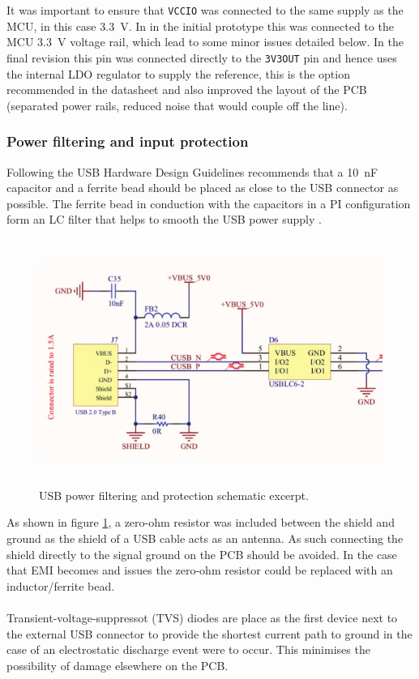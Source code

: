 It was important to ensure that \texttt{VCCIO} was connected to the same supply as the MCU, in this case \SI{3.3}{V}. In in the initial prototype this was connected to the MCU \SI{3.3}{V} voltage rail, which lead to some minor issues detailed below. In the final revision this pin was connected directly to the \texttt{3V3OUT} pin and hence uses the internal LDO regulator to supply the reference, this is the option recommended in the datasheet \cite{ft232r} and also improved the layout of the PCB (separated power rails, reduced noise that would couple off the line).


\subsubsection{Power filtering and input protection}
Following the USB Hardware Design Guidelines \cite{usb_design_guide} recommends that a \SI{10}{nF} capacitor and a ferrite bead should be placed as close to the USB connector as possible. The ferrite bead in conduction with the capacitors in a PI configuration form an LC filter that helps to smooth the USB power supply \cite{usb_filtering}.
\begin{figure}
    \centering
    \includegraphics[height = 8cm]{figures/hardware/usb_power.pdf}
    \caption{USB power filtering and protection schematic excerpt.}
    \label{fig:usb_power}
\end{figure}
As shown in figure \ref{fig:usb_power}, a zero-ohm resistor was included between the shield and ground as the shield of a USB cable acts as an antenna. As such connecting the shield directly to the signal ground on the PCB should be avoided. In the case that EMI becomes and issues the zero-ohm resistor could be replaced with an inductor/ferrite bead.
\\ \\
Transient-voltage-suppressot (TVS) diodes are place as the first device next to the external USB connector to provide the shortest current path to ground in the case of an electrostatic discharge event were to occur. This minimises the possibility of damage elsewhere on the PCB.
